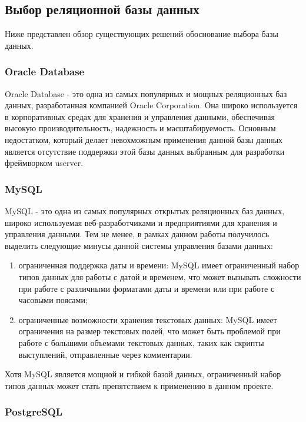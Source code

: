 \subsection{Выбор реляционной базы данных}

Ниже представлен обзор существующих решений обоснование выбора базы данных.

\subsubsection{Oracle Database}

Oracle Database - это одна из самых популярных и мощных реляционных баз данных, разработанная компанией Oracle Corporation. Она широко используется в корпоративных средах для хранения и управления данными, обеспечивая высокую производительность, надежность и масштабируемость. Основным недостатком, который делает невохможным применения данной базы данных является отсутствие поддержки этой базы данных выбранным для разработки фреймворком userver.


\subsubsection{MySQL}

MySQL - это одна из самых популярных открытых реляционных баз данных, широко используемая веб-разработчиками и предприятиями для хранения и управления данными. Тем не менее, в рамках данном работы получилось выделить следующие минусы данной системы управления базами данных: 

\begin{enumerate}
	\item ограниченная поддержка даты и времени: MySQL имеет ограниченный набор типов данных для работы с датой и временем, что может вызывать сложности при работе с различными форматами даты и времени или при работе с часовыми поясами;
	\item ограниченные возможности хранения текстовых данных: MySQL имеет ограничения на размер текстовых полей, что может быть проблемой при работе с большими объемами текстовых данных, таких как скрипты выступлений, отправленные через комментарии.
\end{enumerate}
	
Хотя MySQL является мощной и гибкой базой данных, ограниченный набор типов данных может стать препятствием к применению в данном проекте.


\subsubsection{PostgreSQL}

